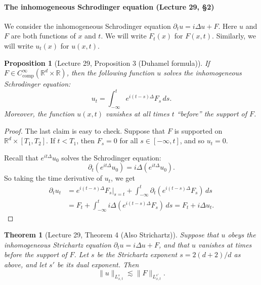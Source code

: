 \documentclass[UTF8,11pt]{ctexart}
\newtheorem*{theorem}{Theorem}
\newtheorem*{proposition}{Proposition}
\theoremstyle{definition}
\newcommand{\R}{\mathbb R}
\begin{document}
\paragraph{The inhomogeneous Schrodinger equation (Lecture 29, \S2)}
We consider the inhomogeneous Schrodinger equation $\partial_tu=i\Delta u+F$. Here $u$ and $F$ are both functions of $x$ and $t$. We will write $F_t(x)$ for $F(x,t)$. Similarly, we will write $u_t(x)$ for $u(x,t)$.
\begin{proposition}[Lecture 29, Proposition 3 (Duhamel formula)]
If $F\in C^\infty_{\mathrm{comp}}(\R^d\times\R)$, then the following function $u$ solves the inhomogeneous Schrodinger equation:
\[u_t=\int_{-\infty}^te^{i(t-s)\Delta}F_s\,ds.\]
Moreover, the function $u(x,t)$ vanishes at all times $t$ ``before'' the support of $F$.
\end{proposition}
\begin{proof}
The last claim is easy to check. Suppose that $F$ is supported on $\R^d\times[T_1,T_2]$. If $t<T_1$, then $F_s=0$ for all $s\in[-\infty,t]$, and so $u_t=0$.

Recall that $e^{it\Delta}u_0$ solves the Schrodinger equation:
\[\partial_t(e^{it\Delta}u_0)=i\Delta(e^{it\Delta}u_0).\]
So taking the time derivative of $u_t$, we get
\begin{align*}
\partial_tu_t&=e^{i(t-s)\Delta}F_s\big|_{s=t}+\int_{-\infty}^t\partial_t(e^{i(t-s)\Delta}F_s)\,ds\\
&=F_t+\int_{-\infty}^ti\Delta(e^{i(t-s)\Delta}F_s)\,ds=F_t+i\Delta u_t.
\end{align*}
\end{proof}
\begin{theorem}[Lecture 29, Theorem 4 (Also Strichartz)]
Suppose that $u$ obeys the inhomogeneous Strichartz equation $\partial_tu=i\Delta u+F$, and that $u$ vanishes at times before the support of $F$. Let $s$ be the Strichartz exponent $s=2(d+2)/d$ as above, and let $s'$ be its dual exponent. Then
\[\|u\|_{L^s_{x,t}}\lesssim\|F\|_{L^{s'}_{x,t}}.\]
\end{theorem}
\end{document}
